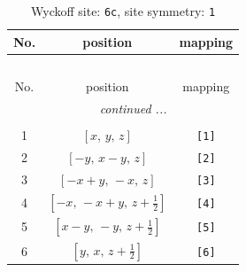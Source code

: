 \documentclass[fleqn,8pt]{jsarticle}
\begin{document}
\begin{longtable}{ccc}
\caption{Wyckoff site: {\tt 6c}, site symmetry: {\tt 1}}
 \\
 \hline \hline
No. & position & mapping \\ \hline \endfirsthead

\multicolumn{2}{l}{\tablename\ \thetable{}} \\
 \hline \hline
No. & position & mapping \\ \hline \endhead

 \hline \hline
\multicolumn{2}{r}{\footnotesize\it continued ...} \\ \endfoot

 \hline \hline
\multicolumn{2}{r}{} \\ \endlastfoot

1 & $\left[ x,\, y,\, z \right]$ & {\tt [1]} \\ \hline
2 & $\left[ - y,\, x - y,\, z \right]$ & {\tt [2]} \\ \hline
3 & $\left[ - x + y,\, - x,\, z \right]$ & {\tt [3]} \\ \hline
4 & $\left[ - x,\, - x + y,\, z + \frac{1}{2} \right]$ & {\tt [4]} \\ \hline
5 & $\left[ x - y,\, - y,\, z + \frac{1}{2} \right]$ & {\tt [5]} \\ \hline
6 & $\left[ y,\, x,\, z + \frac{1}{2} \right]$ & {\tt [6]} \\
\end{longtable}
\end{document}
